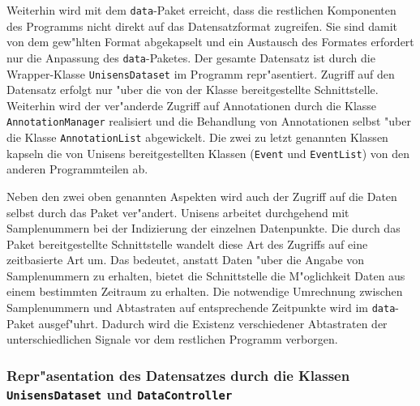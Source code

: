Weiterhin wird mit dem \verb|data|-Paket erreicht, dass die restlichen Komponenten des Programms nicht direkt auf das Datensatzformat zugreifen.
Sie sind damit von dem gew"hlten Format abgekapselt und ein Austausch des Formates erfordert nur die Anpassung des \verb|data|-Paketes.
Der gesamte Datensatz ist durch die Wrapper-Klasse \verb|UnisensDataset| im Programm repr"asentiert.
Zugriff auf den Datensatz erfolgt nur "uber die von der Klasse bereitgestellte Schnittstelle.
Weiterhin wird der ver"anderde Zugriff auf Annotationen durch die Klasse \verb|AnnotationManager| realisiert und die Behandlung von Annotationen selbst "uber die Klasse \verb|AnnotationList| abgewickelt.
Die zwei zu letzt genannten Klassen kapseln die von Unisens bereitgestellten Klassen (\verb|Event| und \verb|EventList|) von den anderen Programmteilen ab.

Neben den zwei oben genannten Aspekten wird auch der Zugriff auf die Daten selbst durch das Paket ver"andert.
Unisens arbeitet durchgehend mit Samplenummern bei der Indizierung der einzelnen Datenpunkte.
Die durch das Paket bereitgestellte Schnittstelle wandelt diese Art des Zugriffs auf eine zeitbasierte Art um.
Das bedeutet, anstatt Daten "uber die Angabe von Samplenummern zu erhalten, bietet die Schnittstelle die M"oglichkeit Daten aus einem bestimmten Zeitraum zu erhalten.
Die notwendige Umrechnung zwischen Samplenummern und Abtastraten auf entsprechende Zeitpunkte wird im \verb|data|-Paket ausgef"uhrt.
Dadurch wird die Existenz verschiedener Abtastraten der unterschiedlichen Signale vor dem restlichen Programm verborgen.

\subsubsection{Repr"asentation des Datensatzes durch die Klassen \texttt{UnisensDataset} und \texttt{DataController}}

